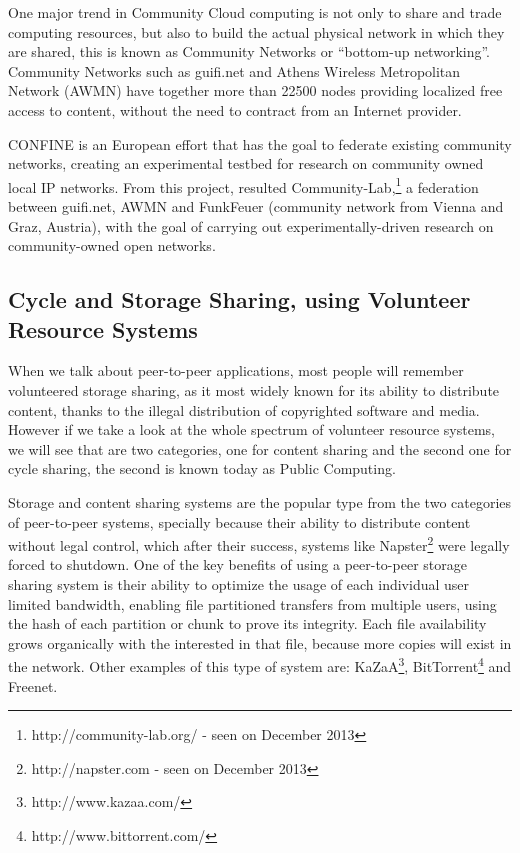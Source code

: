One major trend in Community Cloud computing is not only to share and trade computing resources, but also to build the actual physical network in which they are shared, this is known as Community Networks or ``bottom-up networking''. Community Networks such as guifi.net and Athens Wireless Metropolitan Network (AWMN) have together more than 22500 nodes providing localized free access to content, without the need to contract from an Internet provider.

CONFINE\cite{Navarro} is an European effort that has the goal to federate existing community networks, creating an experimental testbed for research on community owned local IP networks. From this project, resulted Community-Lab,\footnote{http://community-lab.org/ - seen on December 2013} a federation between guifi.net, AWMN and FunkFeuer (community network from Vienna and Graz, Austria), with the goal of carrying out experimentally-driven research on community-owned open networks.



\subsection{Cycle and Storage Sharing, using Volunteer Resource Systems}

When we talk about peer-to-peer applications, most people will remember volunteered storage sharing, as it most widely known for its ability to distribute content, thanks to the illegal distribution of copyrighted software and media. However if we take a look at the whole spectrum of volunteer resource systems, we will see that are two categories, one for content sharing and the second one for cycle sharing, the second is known today as Public Computing.

Storage and content sharing systems are the popular type from the two categories of peer-to-peer systems, specially because their ability to distribute content without legal control, which after their success, systems like Napster\footnote{http://napster.com - seen on December 2013} were legally forced to shutdown. One of the key benefits of using a peer-to-peer storage sharing system is their ability to optimize the usage of each individual user limited bandwidth, enabling file partitioned transfers from multiple users, using the hash of each partition or chunk to prove its integrity. Each file availability grows organically with the interested in that file, because more copies will exist in the network. Other examples of this type of system are: KaZaA\footnote{http://www.kazaa.com/}, BitTorrent\footnote{http://www.bittorrent.com/} and Freenet\cite{Clarke2001}.

